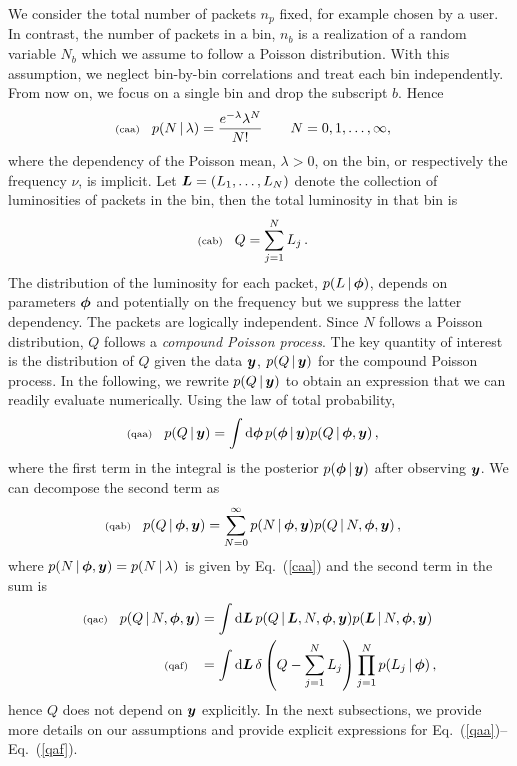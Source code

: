 \documentclass[11pt]{article}
\newcommand{\lleq}[1]{\label{#1} }
\renewcommand{\lleq}[1]{\label{#1} {\scriptstyle {\rm (#1)}} \hspace*{2ex} }
\newcommand{\cond}{\,|\,}
\newcommand{\refeq}[1]{Eq.~(\ref{#1})}
\newcommand{\npack}{{n_p}}
\newcommand{\Lumtot}{Q}
\newcommand{\lumtot}{q}
\newcommand{\Lum}{L}
\newcommand{\lum}{\ell}
\newcommand{\rmdx}[1]{\mbox{d} #1 \,} %
\begin{document}
We consider the total number of packets $\npack$ fixed, for example
chosen by a user. In contrast, the number of packets in a bin, $n_b$
is a realization of a random variable $N_b$ which we assume to follow
a Poisson distribution. With this assumption, we neglect bin-by-bin
correlations and treat each bin independently. From now on, we focus
on a single bin and drop the subscript $b$. Hence
\begin{align}
  \lleq{caa}
  p(N\cond\lambda) &= \frac{e^{-\lambda}\lambda^N}{N!}
  \qquad N = 0,1,\ldots,\infty ,
\end{align}
where the dependency of the Poisson mean, $\lambda>0$, on the bin, or
respectively the frequency $\nu$, is implicit. Let $\bmL = (\Lum_1,\dotsc,\Lum_N)$ denote the
collection of luminosities of packets in the bin, then the total
luminosity in that bin is
\begin{align}
  \lleq{cab}
  \Lumtot &= \sum_{j=1}^{N} \Lum_j%
  \,.
\end{align}
The distribution of the luminosity for each packet,
$p(\Lum \cond \bmphi)$, depends on parameters ${\bm{\phi}}$ and potentially
on the frequency but we suppress the latter dependency.  The packets
are logically independent. Since $N$ follows a Poisson distribution,
$\Lumtot$ follows a \emph{compound Poisson process}.
%
The key quantity of interest is the distribution of $\Lumtot$ given
the data ${\bm{y}}$, $p(\Lumtot \cond \bmy)$ for the compound Poisson
process. In the following, we rewrite $p(\Lumtot \cond \bmy)$ to
obtain an expression that we can readily evaluate numerically. Using
the law of total probability,
\begin{align}
  \lleq{qaa}
  p(\Lumtot \cond \bmy) &= \int \rmdx{\bmphi} p(\bmphi \cond \bmy) p(\Lumtot \cond \bmphi, \bmy) \,,
\end{align}
where the first term in the integral is the posterior $p(\bmphi \cond \bmy)$ after observing ${\bm{y}}$. We can decompose the second term as
\begin{align}
  \lleq{qab}
  p(\Lumtot \cond \bmphi, \bmy) &= \sum_{N=0}^\infty  p(N \cond \bmphi, \bmy) p(\Lumtot \cond N, \bmphi, \bmy)\,,
\end{align}
where $p(N \cond \bmphi, \bmy) = p(N \cond \lambda)$ is given by
\refeq{caa} and the second term in the sum is
\begin{align}
  \lleq{qac}
  p(\Lumtot \cond N, \bmphi, \bmy) &= \int \rmdx{\bmL} p(\Lumtot \cond \bmL, N, \bmphi, \bmy) p(\bmL \cond N, \bmphi, \bmy)\\
  \lleq{qaf}
  &= \int \rmdx{\bmL} \delta \left( \Lumtot - \sum_{j=1}^N \Lum_j  \right) \prod_{j=1}^N p(\Lum_j \cond \bmphi)\,,
\end{align}
hence $Q$ does not depend on ${\bm{y}}$ explicitly. In the next
subsections, we provide more details on our assumptions and provide
explicit expressions for \refeq{qaa}--\refeq{qaf}.
\end{document}
